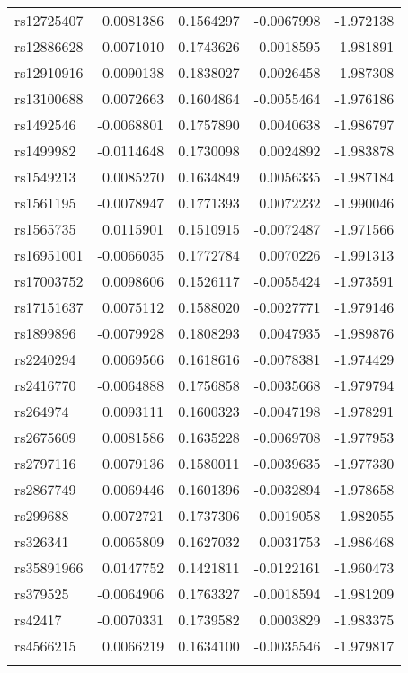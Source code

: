 \documentclass[
]{article}
\theoremstyle{plain}
\begin{document}
{\begin{longtable}[t]{lrrrr}
\addlinespace
rs12725407 & 0.0081386 & 0.1564297 & -0.0067998 & -1.972138\\
rs12886628 & -0.0071010 & 0.1743626 & -0.0018595 & -1.981891\\
rs12910916 & -0.0090138 & 0.1838027 & 0.0026458 & -1.987308\\
rs13100688 & 0.0072663 & 0.1604864 & -0.0055464 & -1.976186\\
rs1492546 & -0.0068801 & 0.1757890 & 0.0040638 & -1.986797\\
\addlinespace
rs1499982 & -0.0114648 & 0.1730098 & 0.0024892 & -1.983878\\
rs1549213 & 0.0085270 & 0.1634849 & 0.0056335 & -1.987184\\
rs1561195 & -0.0078947 & 0.1771393 & 0.0072232 & -1.990046\\
rs1565735 & 0.0115901 & 0.1510915 & -0.0072487 & -1.971566\\
rs16951001 & -0.0066035 & 0.1772784 & 0.0070226 & -1.991313\\
\addlinespace
rs17003752 & 0.0098606 & 0.1526117 & -0.0055424 & -1.973591\\
rs17151637 & 0.0075112 & 0.1588020 & -0.0027771 & -1.979146\\
rs1899896 & -0.0079928 & 0.1808293 & 0.0047935 & -1.989876\\
rs2240294 & 0.0069566 & 0.1618616 & -0.0078381 & -1.974429\\
rs2416770 & -0.0064888 & 0.1756858 & -0.0035668 & -1.979794\\
\addlinespace
rs264974 & 0.0093111 & 0.1600323 & -0.0047198 & -1.978291\\
rs2675609 & 0.0081586 & 0.1635228 & -0.0069708 & -1.977953\\
rs2797116 & 0.0079136 & 0.1580011 & -0.0039635 & -1.977330\\
rs2867749 & 0.0069446 & 0.1601396 & -0.0032894 & -1.978658\\
rs299688 & -0.0072721 & 0.1737306 & -0.0019058 & -1.982055\\
\addlinespace
rs326341 & 0.0065809 & 0.1627032 & 0.0031753 & -1.986468\\
rs35891966 & 0.0147752 & 0.1421811 & -0.0122161 & -1.960473\\
rs379525 & -0.0064906 & 0.1763327 & -0.0018594 & -1.981209\\
rs42417 & -0.0070331 & 0.1739582 & 0.0003829 & -1.983375\\
rs4566215 & 0.0066219 & 0.1634100 & -0.0035546 & -1.979817\\
\addlinespace

\end{longtable}}
\end{document}
